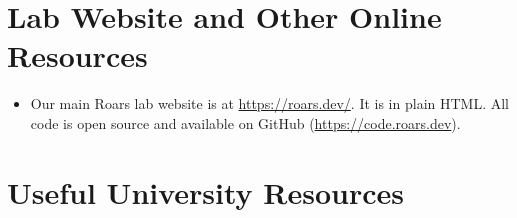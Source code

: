\documentclass[oneside,11pt]{book}
\begin{document}
\chapter{Lab Website and Other Online Resources}

\begin{itemize}
\item Our main Roars lab website is at \url{https://roars.dev/}.  It is in plain HTML. All code is open source and available on GitHub (\url{https://code.roars.dev}).
\end{itemize}

\chapter{Useful University Resources}
\end{document}
